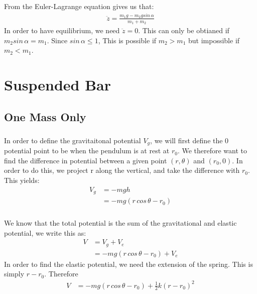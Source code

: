\documentclass{article}
\begin{document}
\subsection{} %

From the Euler-Lagrange equation gives us that:
\begin{align*}
	\ddot{z} = \frac{ m_1g - m_2gsin\,\alpha}{m_1 + m_2}
\end{align*}
In order to have equilibrium, we need $\ddot{z} = 0$. This can only be obtianed if $m_2sin\,\alpha = m_1$. Since $sin\,\alpha \leq 1$, This is possible if $m_2 > m_1$ but impossible if $m_2 < m_1$.

\section{Suspended Bar}

\subsection{One Mass Only}

\subsubsection{} %

In order to define the gravitaitonal potential $V_g$, we will first define the 0 potential point to be when the pendulum is at rest at $r_0$. We therefore want to find the difference in potential between a given point $(r,\theta)$ and $(r_0,0)$. In order to do this, we project r along the vertical, and take the difference with $r_0$. This yields:
\begin{align*}
	V_g &= -mgh\\
	&= -mg(r\,cos\,\theta - r_0)
\end{align*}

\subsubsection{} %

We know that the total potential is the sum of the gravitational and elastic potential, we write this as:
\begin{align*}
	V &= V_g + V_e\\
	&=  -mg(r\,cos\,\theta - r_0) + V_e
\end{align*}
In order to find the elastic potential, we need the extension of the spring. This is simply $r - r_0$. Therefore
\begin{align*}
	V &=  -mg(r\,cos\,\theta - r_0) + \frac{1}{2}k(r-r_0)^2
\end{align*}
\end{document}
